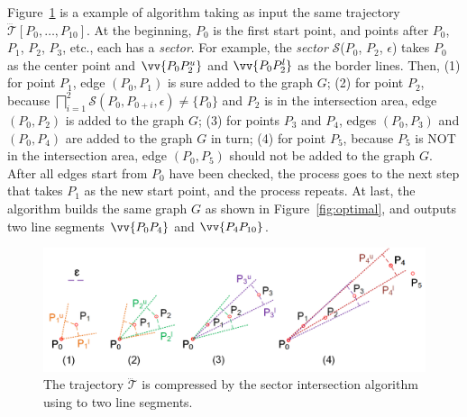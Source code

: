 \begin{example}
	\label{exm-alg-optped}
	Figure~\ref{fig:optped} is a example of algorithm {\optp} taking as input the same trajectory $\dddot{\mathcal{T}}[P_0, \ldots, P_{10}]$. At the beginning, $P_0$ is the first start point, and points after $P_0$, \ie $P_1$, $P_2$, $P_3$, etc., each has a \emph{sector}. For example, the \emph{sector} $\mathcal{S}$($P_0$, $P_{2}$, $\epsilon$) takes $P_0$ as the center point and $\vv{P_0P^u_{2}}$ and $\vv{P_0P^l_{2}}$ as the border lines.
	Then, (1) for point $P_1$, edge $(P_0, P_1)$ is sure added to the graph $G$;
	(2) for point $P_2$, because $\bigsqcap_{i=1}^{2}\mathcal{S}(P_0, P_{0+i}, \epsilon) \ne \{P_0\}$ and $P_2$ is in the intersection area, edge $(P_0, P_2)$ is added to the graph $G$;
	(3) for points $P_3$ and $P_4$, edges $(P_0, P_3)$ and $(P_0, P_4)$ are added to the graph $G$ in turn;
	(4) for point $P_5$, because $P_5$ is NOT in the intersection area, edge $(P_0, P_5)$ should not be added to the graph $G$.
	After all edges start from $P_0$ have been checked, the process goes to the next step that takes $P_1$ as the new start point, and the process repeats. 
	At last, the algorithm builds the same graph $G$ as shown in Figure~\ref{fig:optimal}, and outputs two line segments $\vv{P_0P_4}$ and $\vv{P_4P_{10}}$.
\end{example}

\begin{figure}[tb!]
	\centering
	\hspace{-1ex}\includegraphics[scale=0.66]{Figures/Fig-OptPed.png}\vspace{-3ex}
	\caption{\small The trajectory $\dddot{\mathcal{T}}$ is compressed by the sector intersection algorithm using \ped to two line segments.}	\vspace{-2ex}
	\label{fig:optped}
\end{figure}

